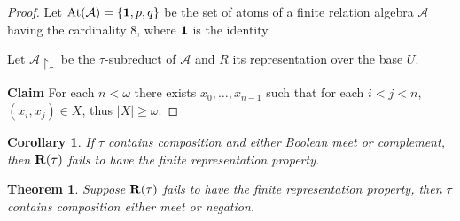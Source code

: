 \documentclass[a4paper]{article}
\theoremstyle{defin}
\theoremstyle{theorem}
\newtheorem{theorem}{Theorem}
\theoremstyle{prop}
\theoremstyle{lemma}
\theoremstyle{ex}
\theoremstyle{col}
\newtheorem{col}{Corollary}
\theoremstyle{claim}
\begin{document}
\begin{proof}
  Let $\operatorname{At}(\mathcal{A}) = \{ {\bf 1}, p, q \}$ be the set of atoms of a finite relation algebra $\mathcal{A}$ having the cardinality $8$, where ${\bf 1}$ is the identity.

  Let $\mathcal{A} \upharpoonright_{\tau}$ be the $\tau$-subreduct of $\mathcal{A}$ and $R$ its representation over the base $U$.

  {\bf Claim} For each $n < \omega$ there exists $x_0, \dots, x_{n - 1}$ such that for each $i < j < n$, $(x_i, x_j) \in X$, thus $|X| \geq \omega$.
\end{proof}

\begin{col}
  If $\tau$ contains composition and either Boolean meet or complement, then ${\bf R}(\tau)$ fails to have the finite representation property.
\end{col}

\begin{theorem}
  Suppose ${\bf R}(\tau)$ fails to have the finite representation property, then $\tau$ contains composition either meet or negation.
\end{theorem}



\end{document}
